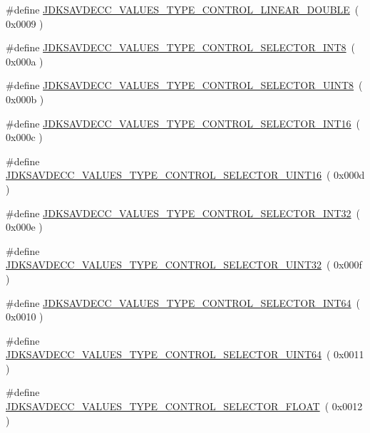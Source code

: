 \begin{DoxyCompactItemize}
\item 
\#define \hyperlink{group__values__type_ga9f699b700ccf1a6373496d5eb996cd7a}{J\+D\+K\+S\+A\+V\+D\+E\+C\+C\+\_\+\+V\+A\+L\+U\+E\+S\+\_\+\+T\+Y\+P\+E\+\_\+\+C\+O\+N\+T\+R\+O\+L\+\_\+\+L\+I\+N\+E\+A\+R\+\_\+\+D\+O\+U\+B\+LE}~( 0x0009 )
\item 
\#define \hyperlink{group__values__type_ga373b4e5d37430683a3425e738471925c}{J\+D\+K\+S\+A\+V\+D\+E\+C\+C\+\_\+\+V\+A\+L\+U\+E\+S\+\_\+\+T\+Y\+P\+E\+\_\+\+C\+O\+N\+T\+R\+O\+L\+\_\+\+S\+E\+L\+E\+C\+T\+O\+R\+\_\+\+I\+N\+T8}~( 0x000a )
\item 
\#define \hyperlink{group__values__type_ga8b8a1bfc99a691684d8a40b749673684}{J\+D\+K\+S\+A\+V\+D\+E\+C\+C\+\_\+\+V\+A\+L\+U\+E\+S\+\_\+\+T\+Y\+P\+E\+\_\+\+C\+O\+N\+T\+R\+O\+L\+\_\+\+S\+E\+L\+E\+C\+T\+O\+R\+\_\+\+U\+I\+N\+T8}~( 0x000b )
\item 
\#define \hyperlink{group__values__type_ga4913f9b60153acf10a99ed9647093f1c}{J\+D\+K\+S\+A\+V\+D\+E\+C\+C\+\_\+\+V\+A\+L\+U\+E\+S\+\_\+\+T\+Y\+P\+E\+\_\+\+C\+O\+N\+T\+R\+O\+L\+\_\+\+S\+E\+L\+E\+C\+T\+O\+R\+\_\+\+I\+N\+T16}~( 0x000c )
\item 
\#define \hyperlink{group__values__type_gafb6394c4b6827d92540e26a33879a359}{J\+D\+K\+S\+A\+V\+D\+E\+C\+C\+\_\+\+V\+A\+L\+U\+E\+S\+\_\+\+T\+Y\+P\+E\+\_\+\+C\+O\+N\+T\+R\+O\+L\+\_\+\+S\+E\+L\+E\+C\+T\+O\+R\+\_\+\+U\+I\+N\+T16}~( 0x000d )
\item 
\#define \hyperlink{group__values__type_ga325ca072b75c6e781298dffeb05a31d2}{J\+D\+K\+S\+A\+V\+D\+E\+C\+C\+\_\+\+V\+A\+L\+U\+E\+S\+\_\+\+T\+Y\+P\+E\+\_\+\+C\+O\+N\+T\+R\+O\+L\+\_\+\+S\+E\+L\+E\+C\+T\+O\+R\+\_\+\+I\+N\+T32}~( 0x000e )
\item 
\#define \hyperlink{group__values__type_ga7476f395f6a18932a01d71ca716e8a21}{J\+D\+K\+S\+A\+V\+D\+E\+C\+C\+\_\+\+V\+A\+L\+U\+E\+S\+\_\+\+T\+Y\+P\+E\+\_\+\+C\+O\+N\+T\+R\+O\+L\+\_\+\+S\+E\+L\+E\+C\+T\+O\+R\+\_\+\+U\+I\+N\+T32}~( 0x000f )
\item 
\#define \hyperlink{group__values__type_ga7780dd1574f86609ce8698708a68f0ce}{J\+D\+K\+S\+A\+V\+D\+E\+C\+C\+\_\+\+V\+A\+L\+U\+E\+S\+\_\+\+T\+Y\+P\+E\+\_\+\+C\+O\+N\+T\+R\+O\+L\+\_\+\+S\+E\+L\+E\+C\+T\+O\+R\+\_\+\+I\+N\+T64}~( 0x0010 )
\item 
\#define \hyperlink{group__values__type_ga5948f05ba389b9b0821a606d460d4ece}{J\+D\+K\+S\+A\+V\+D\+E\+C\+C\+\_\+\+V\+A\+L\+U\+E\+S\+\_\+\+T\+Y\+P\+E\+\_\+\+C\+O\+N\+T\+R\+O\+L\+\_\+\+S\+E\+L\+E\+C\+T\+O\+R\+\_\+\+U\+I\+N\+T64}~( 0x0011 )
\item 
\#define \hyperlink{group__values__type_gaacb8280e811e8f81d3043db539d228ed}{J\+D\+K\+S\+A\+V\+D\+E\+C\+C\+\_\+\+V\+A\+L\+U\+E\+S\+\_\+\+T\+Y\+P\+E\+\_\+\+C\+O\+N\+T\+R\+O\+L\+\_\+\+S\+E\+L\+E\+C\+T\+O\+R\+\_\+\+F\+L\+O\+AT}~( 0x0012 )

\end{DoxyCompactItemize}
